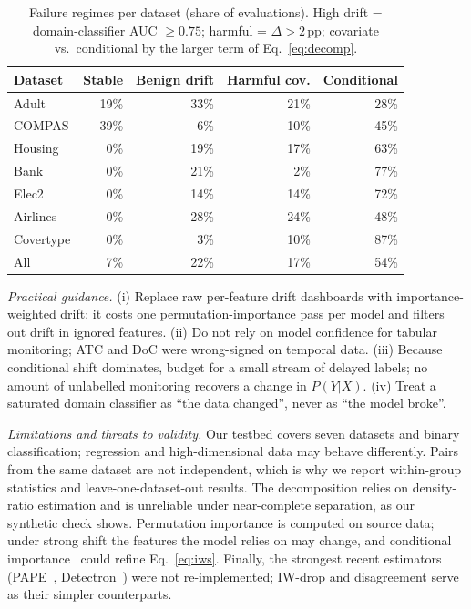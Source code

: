 \documentclass[conference]{IEEEtran}
\theoremstyle{plainhead}
\newcommand{\pp}{\,pp}
\begin{document}
\begin{table}[t]
\centering
\caption{Failure regimes per dataset (share of evaluations). High drift = domain-classifier AUC $\ge0.75$; harmful = $\Delta>2$\pp; covariate vs.\ conditional by the larger term of Eq.~\eqref{eq:decomp}.}
\label{tab:tax}
\footnotesize
\setlength{\tabcolsep}{3.5pt}
\begin{tabular}{lrrrr}
\toprule
Dataset & Stable & Benign drift & Harmful cov. & Conditional \\
\midrule
Adult & 19\% & 33\% & 21\% & 28\% \\
COMPAS & 39\% & 6\% & 10\% & 45\% \\
Housing & 0\% & 19\% & 17\% & 63\% \\
Bank & 0\% & 21\% & 2\% & 77\% \\
Elec2 & 0\% & 14\% & 14\% & 72\% \\
Airlines & 0\% & 28\% & 24\% & 48\% \\
Covertype & 0\% & 3\% & 10\% & 87\% \\
\midrule All & 7\% & 22\% & 17\% & 54\% \\
\bottomrule
\end{tabular}
\end{table}

\textit{Practical guidance.} (i) Replace raw per-feature drift dashboards with importance-weighted drift: it costs one permutation-importance pass per model and filters out drift in ignored features. (ii) Do not rely on model confidence for tabular monitoring; ATC and DoC were wrong-signed on temporal data. (iii) Because conditional shift dominates, budget for a small stream of delayed labels; no amount of unlabelled monitoring recovers a change in $P(Y|X)$. (iv) Treat a saturated domain classifier as ``the data changed'', never as ``the model broke''.

\textit{Limitations and threats to validity.} Our testbed covers seven datasets and binary classification; regression and high-dimensional data may behave differently. Pairs from the same dataset are not independent, which is why we report within-group statistics and leave-one-dataset-out results. The decomposition relies on density-ratio estimation and is unreliable under near-complete separation, as our synthetic check shows. Permutation importance is computed on source data; under strong shift the features the model relies on may change, and conditional importance~\cite{lundberg2017unified} could refine Eq.~\eqref{eq:iws}. Finally, the strongest recent estimators (PAPE~\cite{bialek2025pape}, Detectron~\cite{ginsberg2023detectron}) were not re-implemented; IW-drop and disagreement serve as their simpler counterparts.
\end{document}
